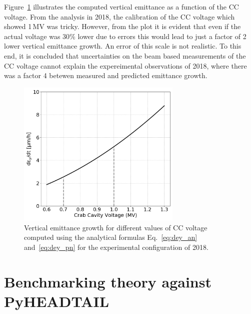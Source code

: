 Figure~\ref{fig:sensitivity_VCC_theory_bunch1} illustrates the computed vertical emittance as a function of the CC voltage. From the analysis in 2018, the calibration of the CC voltage which showed 1\,MV was tricky. However, from the plot it is evident that even if the actual voltage was 30$\%$ lower due to errors this would lead to just a factor of 2 lower vertical emittance growth. An error of this scale is not realistic. To this end, it is concluded that uncertainties on the beam based measurements of the CC voltage cannot explain the expereimental observations of 2018, where there was a factor 4 betewen measured and predicted emittance growth.

\begin{figure}[!h]
    \centering         
    \includegraphics[width=0.7\textwidth]{images/Ch6/dey_vs_Vcc_Coast2-Setting2.png}
        \caption{Vertical emittance growth for different values of CC voltage computed using the analytical formulas Eq.~\eqref{eq:dey_an} and~\eqref{eq:dey_pn} for the experimental configuration of 2018.}
        \label{fig:sensitivity_VCC_theory_bunch1}
 \end{figure}

\section{Benchmarking theory against PyHEADTAIL}\label{sec:benchmark_theory_with_pyheadtail}

